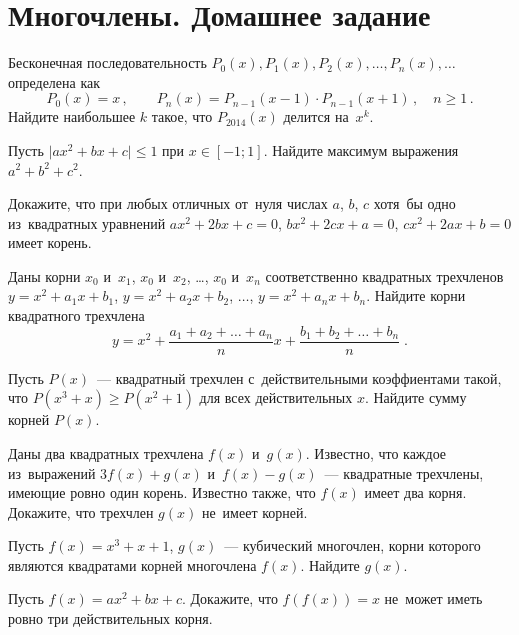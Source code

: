 

\section*{Многочлены. Домашнее задание}


\begingroup
    \def\abs#1{\lvert #1 \rvert}

\begin{problems}

\item
Бесконечная последовательность
$P_0(x), P_1(x), P_2(x), \ldots, P_n(x), \ldots$
определена как
\[
    P_0(x) = x
\, , \qquad
    P_n(x) = P_{n-1}(x - 1) \cdot P_{n-1}(x + 1)
\, , \quad
    n \geq 1
\, . \]
Найдите наибольшее $k$ такое, что $P_{2014}(x)$ делится на~$x^k$.

\item
Пусть $\abs{a x^2 + b x + c} \leq 1$ при $x \in [-1; 1]$.
Найдите максимум выражения $a^2 + b^2 + c^2$.

\item
Докажите, что при любых отличных от~нуля числах $a$, $b$, $c$ хотя~бы одно
из~квадратных уравнений
$a x^2 + 2 b x + c = 0$, $b x^2 + 2 c x + a = 0$, $c x^2 + 2 a x + b = 0$
имеет корень.

\item
Даны корни $x_0$ и~$x_1$, $x_0$ и~$x_2$, \ldots, $x_0$ и~$x_n$ соответственно
квадратных трехчленов
$y = x^2 + a_1 x + b_1$, $y = x^2 + a_2 x + b_2$, $\ldots$,
$y = x^2 + a_n x + b_n$.
Найдите корни квадратного трехчлена
\[
    y
=
    x^2 +
    \frac{a_1 + a_2 + \ldots + a_n}{n} x +
    \frac{b_1 + b_2 + \ldots + b_n}{n}
\; . \]

\item
Пусть $P(x)$~--- квадратный трехчлен с~действительными коэффиентами такой, что
$P(x^3 + x) \geq P(x^2 + 1)$ для всех действительных $x$.
Найдите сумму корней $P(x)$.

\item
Даны два квадратных трехчлена $f(x)$ и~$g(x)$.
Известно, что каждое из~выражений $3 f(x) + g(x)$ и~$f(x) - g(x)$~---
квадратные трехчлены, имеющие ровно один корень.
Известно также, что $f(x)$ имеет два корня.
Докажите, что трехчлен $g(x)$ не~имеет корней.

\item
Пусть $f(x) = x^3 + x + 1$, $g(x)$~--- кубический многочлен, корни которого
являются квадратами корней многочлена $f(x)$.
Найдите $g(x)$.

\item
Пусть $f(x) = a x^2 + b x + c$.
Докажите, что $f(f(x)) = x$ не~может иметь ровно три действительных корня.

\end{problems}

\endgroup %

